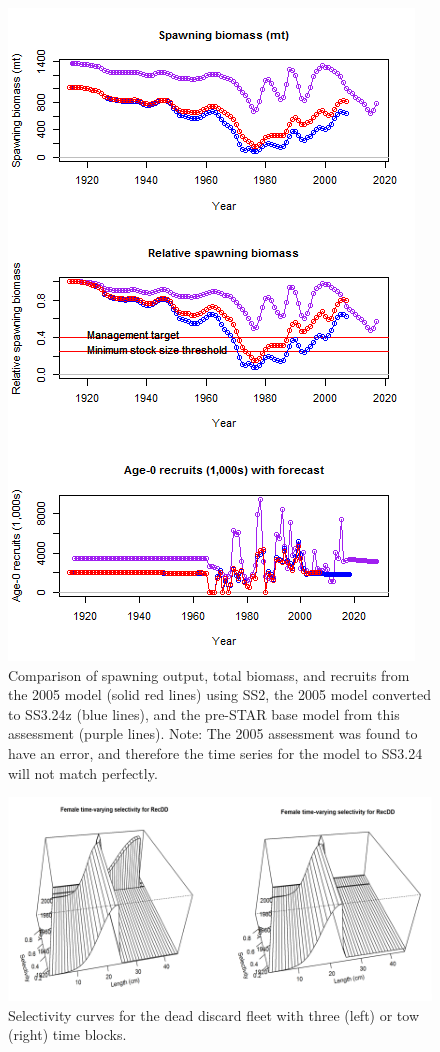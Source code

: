 \documentclass[12pt,]{article}
\begin{document}
\begin{figure}[htbp]
\centering
\includegraphics[height=0.95000\textwidth]{Figures/bridge_timeseries.png}
\caption{Comparison of spawning output, total biomass, and recruits from
the 2005 model (solid red lines) using SS2, the 2005 model converted to
SS3.24z (blue lines), and the pre-STAR base model from this assessment
(purple lines). Note: The 2005 assessment was found to have an error,
and therefore the time series for the model to SS3.24 will not match
perfectly. \label{fig:bridge_timeseries}}
\end{figure}

\begin{figure}[htbp]
\centering
\includegraphics{Figures/Request1.png}
\caption{Selectivity curves for the dead discard fleet with three (left)
or tow (right) time blocks. \label{fig:Request1}}
\end{figure}
\end{document}
